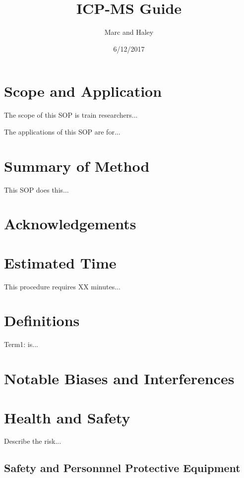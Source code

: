 \documentclass[12pt]{../SOP3}\usepackage[]{graphicx}\usepackage[]{color}
\title{ICP-MS Guide}
\date{6/12/2017}
\author{Marc and Haley}
\begin{document}
\maketitle

\section{Scope and Application}

\NP The scope of this SOP is train researchers...

\NP The applications of this SOP are for...

\section{Summary of Method}

\NP This SOP does this...

\tableofcontents

\newpage

\section{Acknowledgements}

\section{Estimated Time}

\NP This procedure requires XX minutes...

\section{Definitions}

\NP Term1: is...

\section{Notable Biases and Interferences}

\section{Health and Safety}

\NP Describe the risk...


\subsection{Safety and Personnnel Protective Equipment}
\end{document}
